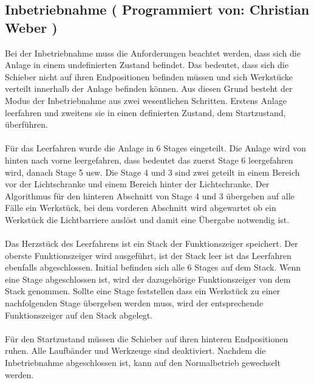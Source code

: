 \documentclass[fontsize=11pt,a4paper,final]{scrartcl}[2003/01/01]
\newcommand*{\chris}{%
	Programmiert von: Christian Weber
}
\begin{document}
\subsection{Inbetriebnahme (\chris)}
Bei der Inbetriebnahme muss die Anforderungen beachtet werden, dass sich die Anlage in einem undefinierten Zustand befindet. Das bedeutet, dass sich die Schieber nicht auf ihren Endpositionen befinden müssen und sich Werkstücke verteilt innerhalb der Anlage befinden können. Aus diesen Grund besteht der Modus der Inbetriebnahme aus zwei wesentlichen Schritten. Erstens Anlage leerfahren und zweitens sie in einen definierten Zustand, dem Startzustand, überführen.\\
\\
Für das Leerfahren wurde die Anlage in 6 Stages eingeteilt. Die Anlage wird von hinten nach vorne leergefahren, dass bedeutet das zuerst Stage 6 leergefahren wird, danach Stage 5 usw. Die Stage 4 und 3 sind zwei geteilt in einem Bereich vor der Lichtschranke und einem Bereich hinter der Lichtschranke. Der Algorithmus für den hinteren Abschnitt von Stage 4 und 3 übergeben auf alle Fälle ein Werkstück, bei dem vorderen Abschnitt wird abgewartet ob ein Werkstück die Lichtbarriere auslöst und damit eine Übergabe notwendig ist.\\
\\
Das Herzstück des Leerfahrens ist ein Stack der Funktionszeiger speichert. Der oberste Funktionszeiger wird ausgeführt, ist der Stack leer ist das Leerfahren ebenfalls abgeschlossen. Initial befinden sich alle 6 Stages auf dem Stack. Wenn eine Stage abgeschlossen ist, wird der dazugehörige Funktionszeiger von dem Stack genommen. Sollte eine Stage feststellen dass ein Werkstück zu einer nachfolgenden Stage übergeben werden muss, wird der entsprechende Funktionszeiger auf den Stack abgelegt.\\
\\
Für den Startzustand müssen die Schieber auf ihren hinteren Endpositionen ruhen. Alle Laufbänder und Werkzeuge sind deaktiviert. Nachdem die Inbetriebnahme abgeschlossen ist, kann auf den Normalbetrieb gewechselt werden.
\end{document}
